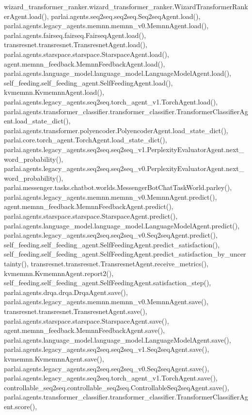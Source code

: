 wizard\+\_\+transformer\+\_\+ranker.\+wizard\+\_\+transformer\+\_\+ranker.\+Wizard\+Transformer\+Ranker\+Agent.\+load(), parlai.\+agents.\+seq2seq.\+seq2seq.\+Seq2seq\+Agent.\+load(), parlai.\+agents.\+legacy\+\_\+agents.\+memnn.\+memnn\+\_\+v0.\+Memnn\+Agent.\+load(), parlai.\+agents.\+fairseq.\+fairseq.\+Fairseq\+Agent.\+load(), transresnet.\+transresnet.\+Transresnet\+Agent.\+load(), parlai.\+agents.\+starspace.\+starspace.\+Starspace\+Agent.\+load(), agent.\+memnn\+\_\+feedback.\+Memnn\+Feedback\+Agent.\+load(), parlai.\+agents.\+language\+\_\+model.\+language\+\_\+model.\+Language\+Model\+Agent.\+load(), self\+\_\+feeding.\+self\+\_\+feeding\+\_\+agent.\+Self\+Feeding\+Agent.\+load(), kvmemnn.\+Kvmemnn\+Agent.\+load(), parlai.\+agents.\+legacy\+\_\+agents.\+seq2seq.\+torch\+\_\+agent\+\_\+v1.\+Torch\+Agent.\+load(), parlai.\+agents.\+transformer\+\_\+classifier.\+transformer\+\_\+classifier.\+Transformer\+Classifier\+Agent.\+load\+\_\+state\+\_\+dict(), parlai.\+agents.\+transformer.\+polyencoder.\+Polyencoder\+Agent.\+load\+\_\+state\+\_\+dict(), parlai.\+core.\+torch\+\_\+agent.\+Torch\+Agent.\+load\+\_\+state\+\_\+dict(), parlai.\+agents.\+legacy\+\_\+agents.\+seq2seq.\+seq2seq\+\_\+v1.\+Perplexity\+Evaluator\+Agent.\+next\+\_\+word\+\_\+probability(), parlai.\+agents.\+legacy\+\_\+agents.\+seq2seq.\+seq2seq\+\_\+v0.\+Perplexity\+Evaluator\+Agent.\+next\+\_\+word\+\_\+probability(), parlai.\+messenger.\+tasks.\+chatbot.\+worlds.\+Messenger\+Bot\+Chat\+Task\+World.\+parley(), parlai.\+agents.\+legacy\+\_\+agents.\+memnn.\+memnn\+\_\+v0.\+Memnn\+Agent.\+predict(), agent.\+memnn\+\_\+feedback.\+Memnn\+Feedback\+Agent.\+predict(), parlai.\+agents.\+starspace.\+starspace.\+Starspace\+Agent.\+predict(), parlai.\+agents.\+language\+\_\+model.\+language\+\_\+model.\+Language\+Model\+Agent.\+predict(), parlai.\+agents.\+legacy\+\_\+agents.\+seq2seq.\+seq2seq\+\_\+v0.\+Seq2seq\+Agent.\+predict(), self\+\_\+feeding.\+self\+\_\+feeding\+\_\+agent.\+Self\+Feeding\+Agent.\+predict\+\_\+satisfaction(), self\+\_\+feeding.\+self\+\_\+feeding\+\_\+agent.\+Self\+Feeding\+Agent.\+predict\+\_\+satisfaction\+\_\+by\+\_\+uncertainty(), transresnet.\+transresnet.\+Transresnet\+Agent.\+receive\+\_\+metrics(), kvmemnn.\+Kvmemnn\+Agent.\+report2(), self\+\_\+feeding.\+self\+\_\+feeding\+\_\+agent.\+Self\+Feeding\+Agent.\+satisfaction\+\_\+step(), parlai.\+agents.\+drqa.\+drqa.\+Drqa\+Agent.\+save(), parlai.\+agents.\+legacy\+\_\+agents.\+memnn.\+memnn\+\_\+v0.\+Memnn\+Agent.\+save(), transresnet.\+transresnet.\+Transresnet\+Agent.\+save(), parlai.\+agents.\+starspace.\+starspace.\+Starspace\+Agent.\+save(), agent.\+memnn\+\_\+feedback.\+Memnn\+Feedback\+Agent.\+save(), parlai.\+agents.\+language\+\_\+model.\+language\+\_\+model.\+Language\+Model\+Agent.\+save(), parlai.\+agents.\+legacy\+\_\+agents.\+seq2seq.\+seq2seq\+\_\+v1.\+Seq2seq\+Agent.\+save(), kvmemnn.\+Kvmemnn\+Agent.\+save(), parlai.\+agents.\+legacy\+\_\+agents.\+seq2seq.\+seq2seq\+\_\+v0.\+Seq2seq\+Agent.\+save(), parlai.\+agents.\+legacy\+\_\+agents.\+seq2seq.\+torch\+\_\+agent\+\_\+v1.\+Torch\+Agent.\+save(), controllable\+\_\+seq2seq.\+controllable\+\_\+seq2seq.\+Controllable\+Seq2seq\+Agent.\+save(), parlai.\+agents.\+transformer\+\_\+classifier.\+transformer\+\_\+classifier.\+Transformer\+Classifier\+Agent.\+score(), 